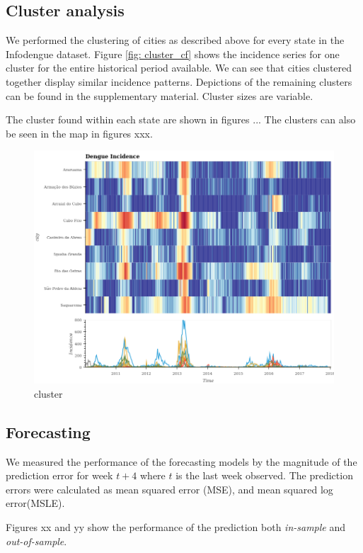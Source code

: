 \documentclass[12pt]{report}
\begin{document}
\subsection{Cluster analysis}

We performed the clustering of cities as described above for every state in the Infodengue dataset. Figure \ref{fig: cluster_cf} shows the incidence series for one cluster for the entire historical period available. We can see that cities clustered together display similar incidence patterns. Depictions of the remaining clusters can be found in the supplementary material. Cluster sizes are variable.


The cluster found within each state are shown in figures ... The clusters can 
also be seen in the map in figures xxx.
\begin{figure}[h]
 \centering
 \includegraphics[scale=0.4]{./cluster_3300209.png}
 \caption{cluster}
\end{figure}

\subsection{Forecasting}
We measured the performance of the forecasting models by the magnitude of the prediction error for week $t+4$ where $t$ is the last week observed. The prediction errors were calculated as mean squared error (MSE), and mean squared log error(MSLE).

Figures xx and yy show the performance of the prediction  both \emph{in-sample} 
and  \emph{out-of-sample}.
\end{document}
